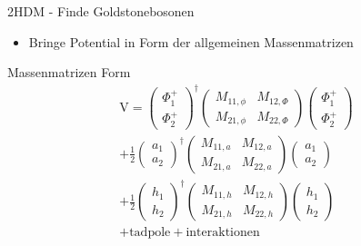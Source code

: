 \documentclass[xcolor=dvipsnames]{beamer}
\begin{document}
\begin{frame}{2HDM - Finde Goldstonebosonen}
\begin{itemize}
\item Bringe Potential in Form der allgemeinen Massenmatrizen
 \end{itemize}
 \begin{block}{Massenmatrizen Form}
 \begin{equation*}
 \begin{split}
\text{V}=\left( \begin{array}{c} \Phi^{+}_{1}\\ \Phi^{+}_{2} \end{array}\right)^{\dagger} \begin{pmatrix} M_{11,\phi} & M_{12,\Phi} \\  M_{21,\phi} & M_{22,\Phi}\end{pmatrix} \left( \begin{array}{c} \Phi^{+}_{1}\\ \Phi^{+}_{2} \end{array}\right)
\\
+\frac{1}{2}\left( \begin{array}{c} a_{1}\\ a_{2} \end{array}\right)^{\dagger} \begin{pmatrix} M_{11,a} & M_{12,a} \\  M_{21,a} & M_{22,a}\end{pmatrix} \left( \begin{array}{c}a_{1}\\ a_{2} \end{array}\right)
\\
+\frac{1}{2}\left( \begin{array}{c} h_{1}\\ h_{2} \end{array}\right)^{\dagger} \begin{pmatrix} M_{11,h} & M_{12,h} \\  M_{21,h} & M_{22,h}\end{pmatrix} \left( \begin{array}{c}h_{1}\\ h_{2} \end{array}\right) 
\\
+ \text{tadpole}+\text{interaktionen}
\end{split}
\end{equation*} 

\end{block}

\end{frame}
\end{document}
